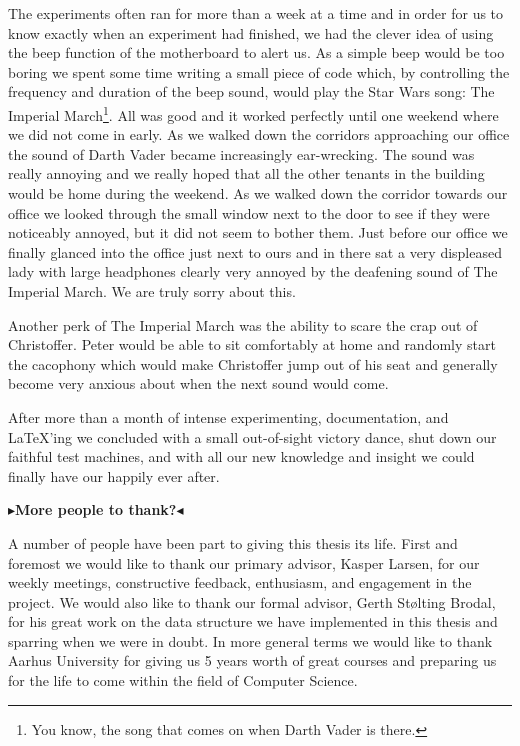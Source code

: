 \documentclass[twoside,11pt,openright]{report}
\newcommand{\todo}[1]{{\color[rgb]{.5,0,0}\textbf{$\blacktriangleright$#1$\blacktriangleleft$}}}
\begin{document}
The experiments often ran for more than a week at a time and in order for us to know exactly when an experiment had finished, we had the clever idea of using the beep function of the motherboard to alert us. As a simple beep would be too boring we spent some time writing a small piece of code which, by controlling the frequency and duration of the beep sound, would play the Star Wars song: The Imperial March\footnote{You know, the song that comes on when Darth Vader is there.}. All was good and it worked perfectly until one weekend where we did not come in early. As we walked down the corridors approaching our office the sound of Darth Vader became increasingly ear-wrecking. The sound was really annoying and we really hoped that all the other tenants in the building would be home during the weekend. As we walked down the corridor towards our office we looked through the small window next to the door to see if they were noticeably annoyed, but it did not seem to bother them. Just before our office we finally glanced into the office just next to ours and in there sat a very displeased lady with large headphones clearly very annoyed by the deafening sound of The Imperial March. We are truly sorry about this.

Another perk of The Imperial March was the ability to scare the crap out of Christoffer. Peter would be able to sit comfortably at home and randomly start the cacophony which would make Christoffer jump out of his seat and generally become very anxious about when the next sound would come.

After more than a month of intense experimenting, documentation, and \LaTeX'ing we concluded with a small out-of-sight victory dance, shut down our faithful test machines, and with all our new knowledge and insight we could finally have our happily ever after.

\todo{More people to thank?}

A number of people have been part to giving this thesis its life. First and foremost we would like to thank our primary advisor, Kasper Larsen, for our weekly meetings, constructive feedback, enthusiasm, and engagement in the project.
We would also like to thank our formal advisor, Gerth St{\o}lting Brodal, for his great work on the data structure we have implemented in this thesis and sparring when we were in doubt.
In more general terms we would like to thank Aarhus University for giving us 5 years worth of great courses and preparing us for the life to come within the field of Computer Science.
\end{document}
